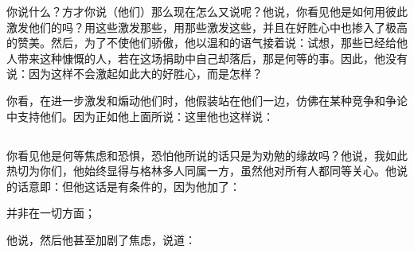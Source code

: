 你说什么？方才你说（他们）那么现在怎么又说呢？他说，你看见他是如何用彼此激发他们的吗？用这些激发那些，用那些激发这些，并且在好胜心中也掺入了极高的赞美。然后，为了不使他们骄傲，他以温和的语气接着说：试想，那些已经给他人带来这种慷慨的人，若在这场捐助中自己却落后，那是何等的事。因此，他没有说：因为这样不会激起如此大的好胜心，而是怎样？\par

你看，在进一步激发和煽动他们时，他假装站在他们一边，仿佛在某种竞争和争论中支持他们。因为正如他上面所说：这里他也这样说：\par


\subsection{}

\par

你看见他是何等焦虑和恐惧，恐怕他所说的话只是为劝勉的缘故吗？他说，我如此热切为你们，他始终显得与格林多人同属一方，虽然他对所有人都同等关心。他说的话意即：但他这话是有条件的，因为他加了：\par

并非在一切方面；\par

他说，然后他甚至加剧了焦虑，说道：\par


\subsection{}

